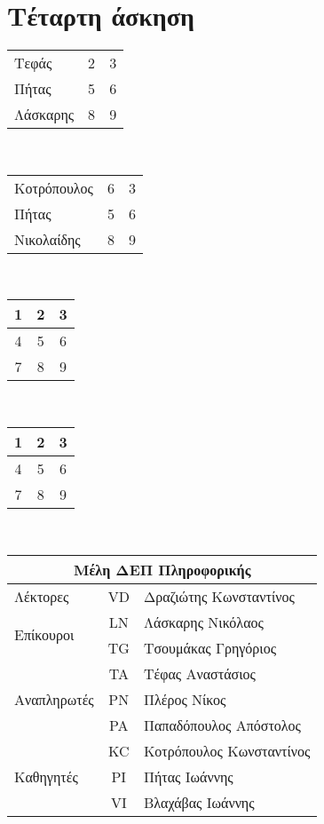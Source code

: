 \documentclass{article}
\begin{document}
\section{Τέταρτη άσκηση} \bigskip
\begin{center}
\begin{tabular}{ l c r }
  Τεφάς & 2 & 3 \\
  Πήτας & 5 & 6 \\
  Λάσκαρης & 8 & 9 \\
\end{tabular} \\\bigskip\medskip
\begin{tabular}{| l | c | r |}
  Κοτρόπουλος & 6 & 3 \\
  Πήτας & 5 & 6 \\
  Νικολαίδης & 8 & 9 \\
\end{tabular}  \\\bigskip\medskip
\begin{tabular}{ | c | c | c |}
    \hline
    1 & 2 & 3 \\ \hline
    4 & 5 & 6 \\ \hline
    7 & 8 & 9 \\
    \hline
\end{tabular}  \\\bigskip\medskip
\begin{tabular}{ | c | c | c |}
    \hline
    1 & 2 & 3 \\ \hline
    4 & 5 & 6 \\ \hline
    7 & 8 & 9 \\
    \hline
\end{tabular}  \\\bigskip\medskip
\begin{tabular}{|l|c|l|}
  \hline
  \multicolumn{3}{|c|}{Μέλη ΔΕΠ Πληροφορικής} \\ \hline
  Λέκτορες & \textlatin{VD} & Δραζιώτης Κωνσταντίνος \\ \hline
  \multirow{2}{*}{Επίκουροι} & \textlatin{LN} & Λάσκαρης Νικόλαος \\
  & \textlatin{TG} & Τσουμάκας Γρηγόριος \\ \hline
  \multirow{3}{*}{Αναπληρωτές} & \textlatin{TA} & Τέφας Αναστάσιος \\
  & \textlatin{PN} & Πλέρος Νίκος \\ & \textlatin{PA} & Παπαδόπουλος Απόστολος \\ \hline
  \multirow{3}{*}{Καθηγητές} & \textlatin{KC} & Κοτρόπουλος Κωνσταντίνος \\
  & \textlatin{PI} & Πήτας Ιωάννης \\ & \textlatin{VI} & Βλαχάβας Ιωάννης \\ \hline
\end{tabular}
\end{center}
\newpage
\end{document}
